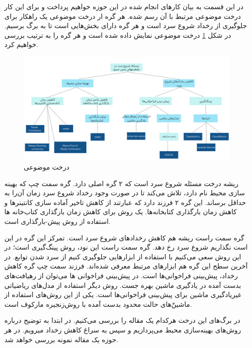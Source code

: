 \label{related-works}

در این قسمت به بیان کارهای انجام شده در این حوزه خواهیم پرداخت و برای این کار درخت موضوعی مرتبط با آن رسم شده. هر گره ار درخت موضوعی یک راهکار برای جلوگیری از رخداد شروع سرد است و هر گره دارای بخش‌هایی است تا به برگ برسیم. در شکل \ref{fig:subject-tree} درخت موضوعی نمایش داده شده است و هر گره را به ترتیب بررسی خواهیم کرد. 

\begin{figure}
	\centering
	\includegraphics[width=\linewidth]{figs/subject-tree}
	\caption {درخت موضوعی}
	\label{fig:subject-tree}
\end{figure}

ریشه درخت مسئله شروع سرد است که ۲ گره اصلی دارد. گره سمت چپ که بهینه سازی محیط نام دارد، تلاش می‌کند تا در صورت وجود رخداد شروع سرد زمان آن‌را به حداقل برساند. این گره ۲ فرزند دارد که عبارتند از کاهش تاخیر آماده سازی کانتینرها و کاهش زمان بارگذاری کتابخانه‌ها. یک روش برای کاهش زمان بارگذاری کتاب‌خانه ها استفاده از روش پیش-بارگذاری است. 


گره سمت راست ریشه هم کاهش رخداد‌های شروع سرد است. تمرکز این گره در این است نگذاریم شروع سرد رخ دهد. گره سمت راست این نود، روش پینگ‌گیری است؛ در این روش سعی می‌کنیم با استفاده از ابزارهایی جلوگیری کنیم از سرد شدن توابع. در آخرین سطح این گره هم ابزارهای مرتبط معرفی شده‌اند. فرزند سمت چپ گره کاهش رخداد، پیش‌بینی فراخوانی‌ها است. در پیش‌بینی فراخوانی ها می‌توان از رهیافت‌های بدست آمده در یادگیری ماشین بهره جست. روش دیگر استفاده از مدل‌های ریاضیاتی غیریادگیری ماشین برای پیش‌بینی فراخوانی‌ها است. یکی از این روش‌های استفاده از ماشین‌ّهای حالت محدود بدست آمده با روش‌زنجیره مارکوف است.

 
در برگ‌های این درخت هرکدام یک مقاله را بررسی می‌کنیم. در ابتدا به توضیح درباره روش‌های بهینه‌سازی محیط می‌پردازیم و سپس به سراغ کاهش رخداد میرویم. در هر حوزه یک مقاله نمونه بررسی خواهد شد. 

